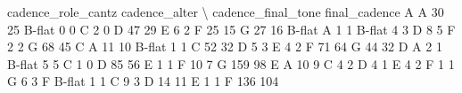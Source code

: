 \documentclass[letterpaper,10pt,english]{sphinxmanual}
\begin{document}
{\begin{sphinxVerbatim}[commandchars=\\\{\}]
                                  cadence\_role\_cantz  cadence\_alter  \textbackslash{}
cadence\_final\_tone final\_cadence
A                  A                              30             25
                   B-flat                          0              0
                   C                               2              0
                   D                              47             29
                   E                               6              2
                   F                              25             15
                   G                              27             16
B-flat             A                               1              1
                   B-flat                          4              3
                   D                               8              5
                   F                               2              2
                   G                              68             45
C                  A                              11             10
                   B-flat                          1              1
                   C                              52             32
                   D                               5              3
                   E                               4              2
                   F                              71             64
                   G                              44             32
D                  A                               2              1
                   B-flat                          5              5
                   C                               1              0
                   D                              85             56
                   E                               1              1
                   F                              10              7
                   G                             159             98
E                  A                              10              9
                   C                               4              2
                   D                               4              1
                   E                               4              2
                   F                               1              1
                   G                               6              3
F                  B-flat                          1              1
                   C                               9              3
                   D                              14             11
                   E                               1              1
                   F                             136            104

\end{sphinxVerbatim}}
\end{document}
